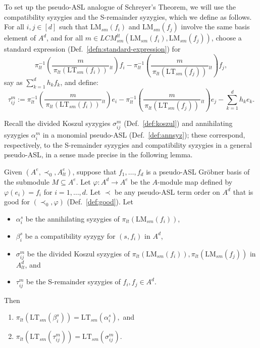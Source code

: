 \documentclass[11pt,reqno]{amsart}
\newcommand{\ltfrac}[2]{\frac{\,#1\,}{\,#2\,}{}_{{\scriptscriptstyle lt}}}
\newcommand{\lmsm}{\text{LM}_{sm}}
\newcommand{\ltsm}{\text{LT}_{sm}}
\newcommand{\lcmlt}{LCM_{sm}^{lt}}
\newcommand{\piltd}{\pi_{lt}}
\theoremstyle{definition}
\numberwithin{equation}{section}
\begin{document}
To set up the pseudo-ASL analogue of Schreyer's Theorem, we will use the compatibility syzygies and the S-remainder syzygies, which we define as follows. For all $i,j \in [d]$ such that $\lmsm(f_i)$ and $\lmsm(f_j)$ involve the same basis element of $A^d$, and for all $m \in \lcmlt(\lmsm(f_i), \lmsm(f_j))$, choose a standard expression (Def.~\ref{defn:standard-expression}) for 
\[
\pi_{lt}^{-1}\left(\ltfrac{m}{\pi_{lt}(\ltsm(f_i))} \right) f_i - \pi_{lt}^{-1}\left(\ltfrac{m}{\pi_{lt}(\ltsm(f_j))}\right) f_j,
\]
say as $\sum_{k=1}^d h_k f_k$, and define:
\[
\tau_{ij}^m := \pi_{lt}^{-1}\left( \ltfrac{m}{ \pi_{lt}(\ltsm(f_i))} \right) e_i - \pi_{lt}^{-1}\left(\ltfrac{m}{\pi_{lt}(\ltsm(f_j))}\right) e_j - \sum_{k=1}^d h_k e_k. 
\]

Recall the divided Koszul syzygies $\sigma_{ij}^m$ (Def.~\ref{def:koszul}) and annihilating syzygies $\alpha_i^m$ in a monomial pseudo-ASL (Def.~\ref{def:annsyz}); these correspond, respectively, to the S-remainder syzygies and compatibility syzygies in a general pseudo-ASL, in a sense made precise in the following lemma.

\begin{lemma} \label{lem:syz_leading}
Given $(A^e, \prec_0, A_{lt}^e)$, suppose that $f_1, \dotsc, f_d$ is a pseudo-ASL Gröbner basis of the submodule $M \subseteq A^e$. Let $\varphi \colon A^d \to A^e$ be the $A$-module map defined by $\varphi(e_i) = f_i$ for $i=1,\dotsc,d$. Let $\prec$ be any pseudo-ASL term order on $A^d$ that is good for $(\prec_0, \varphi)$ (Def.~\ref{def:good}). Let 
\begin{itemize}
\item $\alpha_i^s$ be the annihilating syzygies of $\piltd(\lmsm(f_i))$, 
\item $\beta_i^s$ be a compatibility syzygy for $(s,f_i)$ in $A^d$, 
\item $\sigma_{ij}^m$ be the divided Koszul syzygies of $\piltd(\lmsm(f_i)), \piltd(\lmsm(f_j))$ in $A_{lt}^d$, and
\item $\tau_{ij}^m$ be the S-remainder syzygies of $f_i, f_j \in A^d$.
\end{itemize}
Then
\begin{enumerate}
\item 
$\piltd(\ltsm(\beta_i^s)) = \ltsm(\alpha_i^s),$ and

\item 
$\piltd(\ltsm(\tau_{ij}^m)) = \ltsm(\sigma_{ij}^m)$.
\end{enumerate}
\end{lemma}
\end{document}
